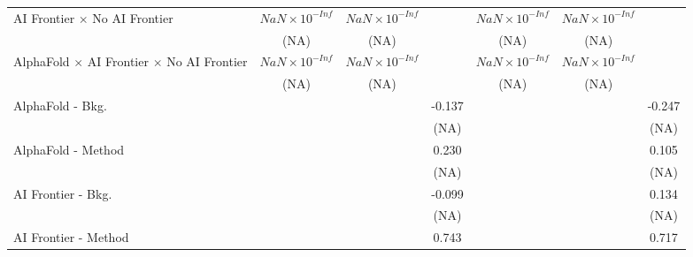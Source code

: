 \begin{tabular}{lcccccc}
   AI Frontier $\times$ No AI Frontier                                        & $NaN\times 10^{-Inf}$  & $NaN\times 10^{-Inf}$  &                        & $NaN\times 10^{-Inf}$  & $NaN\times 10^{-Inf}$  &   \\   
                                                                              & (NA)                   & (NA)                   &                        & (NA)                   & (NA)                   &   \\   
   AlphaFold $\times$ AI Frontier $\times$ No AI Frontier                     & $NaN\times 10^{-Inf}$  & $NaN\times 10^{-Inf}$  &                        & $NaN\times 10^{-Inf}$  & $NaN\times 10^{-Inf}$  &   \\   
                                                                              & (NA)                   & (NA)                   &                        & (NA)                   & (NA)                   &   \\   
   AlphaFold - Bkg.                                                           &                        &                        & -0.137                 &                        &                        & -0.247\\   
                                                                              &                        &                        & (NA)                   &                        &                        & (NA)\\   
   AlphaFold - Method                                                         &                        &                        & 0.230                  &                        &                        & 0.105\\   
                                                                              &                        &                        & (NA)                   &                        &                        & (NA)\\   
   AI Frontier - Bkg.                                                         &                        &                        & -0.099                 &                        &                        & 0.134\\   
                                                                              &                        &                        & (NA)                   &                        &                        & (NA)\\   
   AI Frontier - Method                                                       &                        &                        & 0.743                  &                        &                        & 0.717\\   

\end{tabular}
